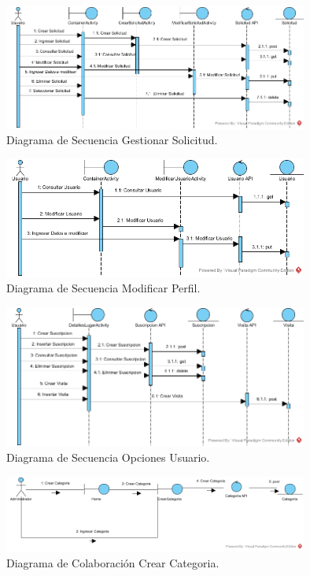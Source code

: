 \documentclass[12pt,letterpaper,openany]{book}
\begin{document}
\begin{figure}[H]
\begin{center}
\includegraphics[width=10cm]{./imagenes/DS/DS_gestionar_solicitud}
\caption{Diagrama de Secuencia Gestionar Solicitud.}
\end{center}
\end{figure}

\begin{figure}[H]
\begin{center}
\includegraphics[width=10cm]{./imagenes/DS/DS_modificar_perfil}
\caption{Diagrama de Secuencia Modificar Perfil.}
\end{center}
\end{figure}

\begin{figure}[H]
\begin{center}
\includegraphics[width=10cm]{./imagenes/DS/DS_opciones_usuario}
\caption{Diagrama de Secuencia Opciones Usuario.}
\end{center}
\end{figure}

\begin{figure}[H]
\begin{center}
\includegraphics[width=10cm]{./imagenes/DC/DC_crear_categoria}
\caption{Diagrama de Colaboración Crear Categoria.}
\end{center}
\end{figure}
\end{document}
